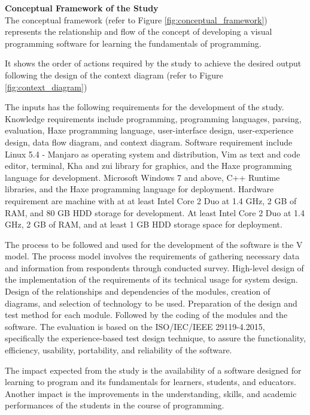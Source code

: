 \flushleft
\textbf{Conceptual Framework of the Study}\\

\justifying
\parx
The conceptual framework (refer to Figure \ref{fig:conceptual_framework}) represents the relationship
and flow of the concept of developing a visual programming software for learning the
fundamentals of programming.

\parx
It shows the order of actions required by the study to achieve the desired
output following the design of the context diagram (refer to Figure \ref{fig:context_diagram})

\parx
The inputs has the following requirements for the development of the study.
Knowledge requirements include programming, programming languages, parsing,
evaluation, Haxe programming language, user-interface design, user-experience
design, data flow diagram, and context diagram.  Software requirement include
Linux 5.4 - Manjaro as operating system and distribution, Vim as text and code
editor, terminal, Kha and zui library for graphics, and the Haxe programming
language for development. Microsoft Windows 7 and above, C++ Runtime libraries,
and the Haxe programming language for deployment.  Hardware requirement are
machine with at at least Intel Core 2 Duo at 1.4 GHz, 2 GB of RAM, and 80 GB
HDD storage for development. At least Intel Core 2 Duo at 1.4 GHz, 2 GB of RAM,
and at least 1 GB HDD storage space for deployment.

\parx
The process to be followed and used for the development of the software is the V model.
The process model involves the requirements of gathering necessary data and information
from respondents through conducted survey. High-level design of the implementation of
the requirements of its technical usage for system design. Design of the relationships
and dependencies of the modules, creation of diagrams, and selection of technology to
be used. Preparation of the design and test method for each module. Followed by the
coding of the modules and the software. The evaluation is based on the ISO/IEC/IEEE
29119-4.2015, specifically the experience-based test design technique, to assure the
functionality, efficiency, usability, portability, and reliability of the software.

\parx
The impact expected from the study is the availability of a software designed for
learning to program and its fundamentals for learners, students, and educators.
Another impact is the improvements in the understanding, skills, and academic
performances of the students in the course of programming.


